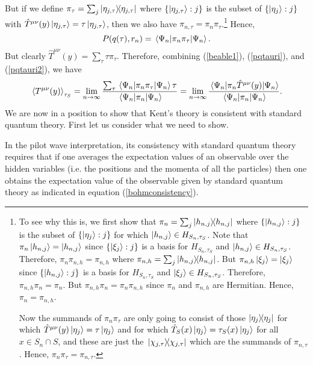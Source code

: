 But if we define $\pi_\tau=\sum_j\dyad{\eta_{j,\tau}}$ where $\{\ket{\eta_{j,\tau}}:j\}$ is the subset of  $\{\ket{\eta_j}:j\}$ with $\hat{T}^{\mu\nu}(y)\ket{\eta_{j,\tau}}=\tau\ket{\eta_{j,\tau}}$, then we also have  $\pi_{n,\tau}=\pi_n\pi_\tau$.\footnote{To see why this is, 
we first show that $\pi_n=\sum_j\dyad{h_{n,j}}$ where $\{\ket{h_{n,j}}:j\}$ is the subset of $\{\ket{\eta_j}:j\}$  for which $\ket{h_{n,j}}\in H_{S_n,\tau_S}$. 
Note that $\pi_n\ket{h_{n,j}}=\ket{h_{n,j}}$    since $\{\ket{\xi_j}:j\}$ is a basis for $H_{S_n,\tau_S}$ and $\ket{h_{n,j}}\in H_{S_n,\tau_S}$. 
Therefore, $\pi_n\pi_{n,h}=\pi_{n,h}$  where  $\pi_{n,h}=\sum_j\dyad{h_{n,j}}$. 
But  $\pi_{n,h}\ket{\xi_j}=\ket{\xi_j}$ since $\{\ket{h_{n,j}}:j\}$ is a basis for $H_{S_n,\tau_S}$ and $\ket{\xi_j}\in H_{S_n,\tau_S}$. 
Therefore, $\pi_{n,h}\pi_n=\pi_n.$ But $\pi_{n,h}\pi_n= \pi_n\pi_{n,h}$ since $\pi_n$ and $\pi_{n,h}$ are Hermitian. Hence, $\pi_n= \pi_{n,h}$.

Now the summands of $\pi_n\pi_\tau$ are only going to consist of those $\dyad{\eta_j}$ for which $\hat{T}^{\mu\nu}(y)\ket{\eta_j}=\tau\ket{\eta_j}$ and for which $\hat{T}_S(x)\ket{\eta_j}=\tau_S(x)\ket{\eta_j}$ for all $x\in S_n\cap S$, and these are just the $\dyad*{\chi_{j,\tau}}$ which are the summands of  $\pi_{n,\tau}$. Hence,  $\pi_n\pi_\tau=\pi_{n,\tau}.$} 
  Hence,
\begin{equation}\label{pqtauri2}
P(q(\tau), r_n)=\ev*{\pi_n\pi_\tau}{\Psi_n}.
\end{equation}
But clearly $\hat{T}^{\mu\nu}(y)=\sum_\tau \tau \pi_\tau.$ Therefore, combining (\ref{beable1}), (\ref{pqtauri}), and (\ref{pqtauri2}), we have 
\begin{equation}\label{kentconsistency0}
\ev*{T^{\mu\nu}(y)}_{\tau_S}=\lim_{n\rightarrow\infty}\frac{\sum_\tau \ev*{\pi_n\pi_\tau}{\Psi_n}\tau}{\ev*{\pi_n}{\Psi_n}}=\lim_{n\rightarrow\infty}\frac{\ev*{\pi_n\hat{T}^{\mu\nu}(y)}{\Psi_n}}{\ev*{\pi_n}{\Psi_n}}.
\end{equation}
We are now in a position to show that Kent's theory is consistent with standard quantum theory. First let us consider what we need to show. 

In the pilot wave interpretation, its consistency with standard quantum theory requires that if one averages the expectation values of an observable over the hidden variables (i.e. the positions and the momenta of all the particles) then one obtains the expectation value of the observable given by standard quantum theory as indicated in equation (\ref{bohmconsistency}). 

